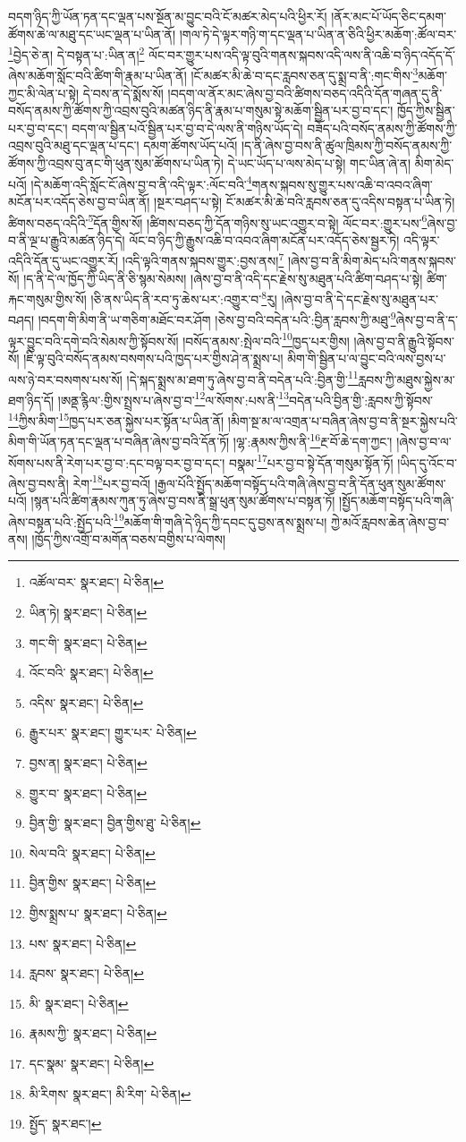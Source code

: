 བདག་ཉིད་ཀྱི་ཡོན་ཏན་དང་ལྡན་པས་སྔོན་མ་བྱུང་བའི་ངོ་མཚར་མེད་པའི་ཕྱིར་རོ། །ནོར་མང་པོ་ཡོད་ཅིང་དམག་ཚོགས་ཆེ་ལ་མཐུ་དང་ཡང་ལྡན་པ་ཡིན་ནོ། །གལ་ཏེ་དེ་ལྟར་གཉི་ག་དང་ལྡན་པ་ཡིན་ན་ཅིའི་ཕྱིར་མཆོག་:ཚོལ་བར་\footnote{འཚོལ་བར་  སྣར་ཐང་།  པེ་ཅིན། }བྱེད་ཅེ་ན། དེ་བསྟན་པ་:ཡིན་ན།\footnote{ཡིན་ཏེ།  སྣར་ཐང་།  པེ་ཅིན། } ལོང་བར་གྱུར་པས་འདི་ལྟ་བུའི་གནས་སྐབས་འདི་ལས་ནི་འཆི་བ་ཉིད་འདོད་དོ་ཞེས་མཆོག་སློང་བའི་ཚིག་གི་རྣམ་པ་ཡིན་ནོ། །ངོ་མཚར་མི་ཆེ་བ་དང་རླབས་ཅན་དུ་སྨྲ་བ་ནི་:གང་གིས་\footnote{གང་གི་  སྣར་ཐང་།  པེ་ཅིན། }མཆོག་ཀྱང་མི་ལེན་པ་སྟེ། དེ་བས་ན་དེ་སྨོས་སོ། །བདག་ལ་ནོར་མང་ཞེས་བྱ་བའི་ཚིགས་བཅད་འདིའི་དོན་གཞན་དུ་ནི་བསོད་ནམས་ཀྱི་ཚོགས་ཀྱི་འབྲས་བུའི་མཚན་ཉིད་ནི་རྣམ་པ་གསུམ་སྟེ་མཆོག་སྦྱིན་པར་བྱ་བ་དང་། ཁྱོད་ཀྱིས་སྦྱིན་པར་བྱ་བ་དང་། བདག་ལ་སྦྱིན་པའོ་སྦྱིན་པར་བྱ་བ་དེ་ལས་ནི་གཉིས་ཡོད་དེ། བཟོད་པའི་བསོད་ནམས་ཀྱི་ཚོགས་ཀྱི་འབྲས་བུའི་མཐུ་དང་ལྡན་པ་དང་། དམག་ཚོགས་ཡོད་པའོ། །ད་ནི་ཞེས་བྱ་བས་ནི་ཚུལ་ཁྲིམས་ཀྱི་བསོད་ནམས་ཀྱི་ཚོགས་ཀྱི་འབྲས་བུ་ནང་གི་ཕུན་སུམ་ཚོགས་པ་ཡིན་ཏེ། དེ་ཡང་ཡོད་པ་ལས་མེད་པ་སྟེ། གང་ཡིན་ཞེ་ན། མིག་མེད་པའོ། །དེ་མཆོག་འདི་སློང་ངོ་ཞེས་བྱ་བ་ནི་འདི་ལྟར་:ལོང་བའི་\footnote{འོང་བའི་  སྣར་ཐང་།  པེ་ཅིན། }གནས་སྐབས་སུ་གྱུར་པས་འཆི་བ་འབའ་ཞིག་མངོན་པར་འདོད་ཅེས་བྱ་བ་ཡིན་ནོ། །སྔར་བཤད་པ་སྟེ། ངོ་མཚར་མི་ཆེ་བའི་རླབས་ཅན་དུ་འདིས་བསྟན་པ་ཡིན་ཏེ། ཚིགས་བཅད་འདིའི་\footnote{འདིས་  སྣར་ཐང་།  པེ་ཅིན། }དོན་གྱིས་སོ། །ཚིགས་བཅད་ཀྱི་དོན་གཉིས་སུ་ཡང་འགྱུར་བ་སྟེ། ལོང་བར་:གྱུར་པས་\footnote{རྒྱུར་པར་  སྣར་ཐང་། གྱུར་པར་  པེ་ཅིན། }ཞེས་བྱ་བ་ནི་ལྔ་པ་རྒྱུའི་མཚན་ཉིད་དེ། ལོང་བ་ཉིད་ཀྱི་རྒྱུས་འཆི་བ་འབའ་ཞིག་མངོན་པར་འདོད་ཅེས་སྦྱར་ཏེ། འདི་ལྟར་འདིའི་དོན་དུ་ཡང་འགྱུར་རོ། །འདི་ལྟའི་གནས་སྐབས་གྱུར་:བྱས་ནས།\footnote{བྱས་ན།  སྣར་ཐང་།  པེ་ཅིན། } །ཞེས་བྱ་བ་ནི་མིག་མེད་པའི་གནས་སྐབས་སོ། །ད་ནི་དེ་ལ་ཁྱོད་ཀྱི་ཡིད་ནི་ཅི་སྙམ་སེམས། །ཞེས་བྱ་བ་ནི་འདི་དང་རྗེས་སུ་མཐུན་པའི་ཚིག་བཤད་པ་སྟེ། ཚིག་རྐང་གསུམ་གྱིས་སོ། །ཅི་ནས་ཡིད་ནི་རབ་ཏུ་ཆེས་པར་:འགྱུར་བ་\footnote{གྱུར་བ་  སྣར་ཐང་།  པེ་ཅིན། }རུ། །ཞེས་བྱ་བ་ནི་དེ་དང་རྗེས་སུ་མཐུན་པར་བཤད། །བདག་གི་མིག་ནི་ཡ་གཅིག་མཐོང་བར་ཤོག །ཅེས་བྱ་བའི་བདེན་པའི་:བྱིན་རླབས་ཀྱི་མཐུ་\footnote{བྱིན་གྱི་  སྣར་ཐང་། བྱིན་གྱིས་ཐུ་  པེ་ཅིན། }ཞེས་བྱ་བ་ནི་ད་ལྟར་བྱུང་བའི་དགེ་བའི་སེམས་ཀྱི་སྟོབས་སོ། །བསོད་ནམས་:སྤེལ་བའི་\footnote{སེལ་བའི་  སྣར་ཐང་།  པེ་ཅིན། }ཁྱད་པར་གྱིས། །ཞེས་བྱ་བ་ནི་རྒྱུའི་སྟོབས་སོ། །ཇི་ལྟ་བུའི་བསོད་ནམས་བསགས་པའི་ཁྱད་པར་གྱིས་ཤེ་ན་སྨྲས་པ། མིག་གི་སྦྱིན་པ་ལ་བྱུང་བའི་ལས་བྱས་པ་ལས་ཉེ་བར་བསགས་པས་སོ། །དེ་སྐད་སྨྲས་མ་ཐག་ཏུ་ཞེས་བྱ་བ་ནི་བདེན་པའི་:བྱིན་གྱི་\footnote{བྱིན་གྱིས་  སྣར་ཐང་།  པེ་ཅིན། }རླབས་ཀྱི་མཐུས་སྐྱེས་མ་ཐག་ཉིད་དོ། །ཨནྡ་རྙིལ་:གྱིས་སྤྲས་པ་ཞེས་བྱ་བ་\footnote{གྱིས་སྨྲས་པ་  སྣར་ཐང་།  པེ་ཅིན། }ལ་སོགས་:པས་ནི་\footnote{པས་  སྣར་ཐང་།  པེ་ཅིན། }བདེན་པའི་བྱིན་གྱི་:རླབས་ཀྱི་སྟོབས་\footnote{རླབས་  སྣར་ཐང་།  པེ་ཅིན། }ཀྱིས་མིག་\footnote{མི་  སྣར་ཐང་།  པེ་ཅིན། }ཁྱད་པར་ཅན་སྐྱེས་པར་སྟོན་པ་ཡིན་ནོ། །མིག་སྔ་མ་ལ་འགྲན་པ་བཞིན་ཞེས་བྱ་བ་ནི་སྔར་སྐྱེས་པའི་མིག་གི་ཡོན་ཏན་དང་ལྡན་པ་བཞིན་ཞེས་བྱ་བའི་དོན་ཏོ། །ལྷ་:རྣམས་ཀྱིས་ནི་\footnote{རྣམས་ཀྱི་  སྣར་ཐང་།  པེ་ཅིན། }རྔ་བོ་ཆེ་དག་ཀྱང་། །ཞེས་བྱ་བ་ལ་སོགས་པས་ནི་རེག་པར་བྱ་བ་:དང་བལྟ་བར་བྱ་བ་དང་། བསྣམ་\footnote{དང་སྣམ་  སྣར་ཐང་།  པེ་ཅིན། }པར་བྱ་བ་སྟེ་དོན་གསུམ་སྟོན་ཏོ། །ཡིད་དུ་འོང་བ་ཞེས་བྱ་བས་ནི། རེག་\footnote{མི་རིགས་  སྣར་ཐང་། མི་རིག་  པེ་ཅིན། }པར་བྱ་བའོ། །རྒྱལ་པོའི་སྤྱོད་མཆོག་བསྟོད་པའི་གཞི་ཞེས་བྱ་བ་ནི་དོན་ཕུན་སུམ་ཚོགས་པའོ། །སྙན་པའི་ཚིག་རྣམས་ཀུན་ཏུ་ཞེས་བྱ་བས་ནི་སྒྲ་ཕུན་སུམ་ཚོགས་པ་བསྟན་ཏོ། །སྤྱོད་མཆོག་བསྟོད་པའི་གཞི་ཞེས་བསྟན་པའི་:སྤྱོད་པའི་\footnote{སྤྱོད་  སྣར་ཐང་། }མཆོག་གི་གཞི་དེ་ཉིད་ཀྱི་དབང་དུ་བྱས་ནས་སྨྲས་པ། ཀྱེ་མའོ་རླབས་ཆེན་ཞེས་བྱ་བ་ནས། །ཁྱོད་ཀྱིས་འགྲོ་བ་མགོན་བཅས་བགྱིས་པ་ལེགས། 